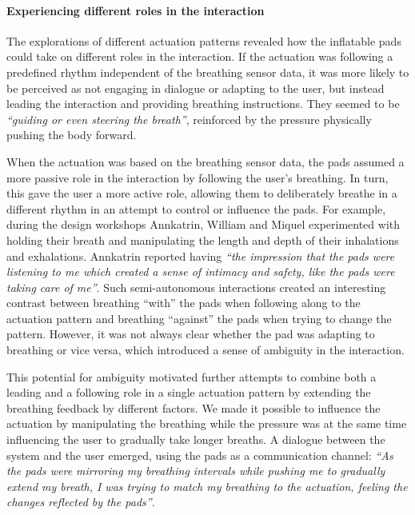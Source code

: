 \paragraph{Experiencing different roles in the interaction}

The explorations of different actuation patterns revealed how the inflatable pads could take on different roles in the interaction. If the actuation was following a predefined rhythm independent of the breathing sensor data, it was more likely to be perceived as not engaging in dialogue or adapting to the user, but instead leading the interaction and providing breathing instructions. They seemed to be \textit{``guiding or even steering the breath''}, reinforced by the pressure physically pushing the body forward.

When the actuation was based on the breathing sensor data, the pads assumed a more passive role in the interaction by following the user’s breathing. In turn, this gave the user a more active role, allowing them to deliberately breathe in a different rhythm in an attempt to control or influence the pads. For example, during the design workshops Annkatrin, William and Miquel experimented with holding their breath and manipulating the length and depth of their inhalations and exhalations. Annkatrin reported having \textit{``the impression that the pads were listening to me which created a sense of intimacy and safety, like the pads were taking care of me''}. Such semi-autonomous interactions created an interesting contrast between breathing “with” the pads when following along to the actuation pattern and breathing “against” the pads when trying to change the pattern. However, it was not always clear whether the pad was adapting to breathing or vice versa, which introduced a sense of ambiguity in the interaction.

This potential for ambiguity motivated further attempts to combine both a leading and a following role in a single actuation pattern by extending the breathing feedback by different factors. We made it possible to influence the actuation by manipulating the breathing while the pressure was at the same time influencing the user to gradually take longer breaths. A dialogue between the system and the user emerged, using the pads as a communication channel: \textit{``As the pads were mirroring my breathing intervals while pushing me to gradually extend my breath, I was trying to match my breathing to the actuation, feeling the changes reflected by the pads''}.

